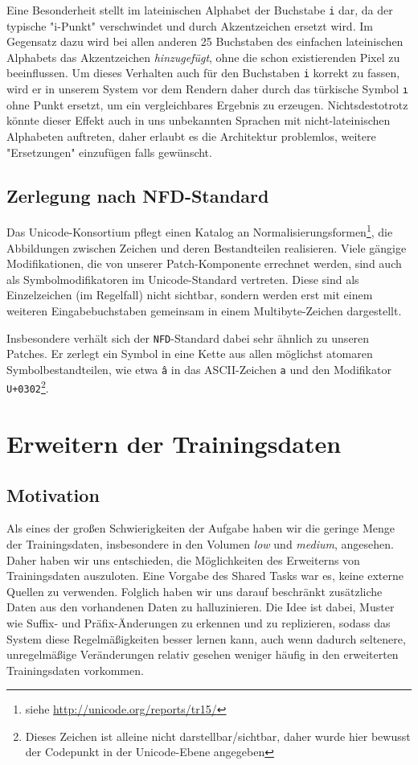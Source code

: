 \documentclass[a4paper]{article}
\begin{document}
Eine Besonderheit stellt im lateinischen Alphabet der Buchstabe \texttt{i} dar, da der typische "i-Punkt" verschwindet und durch Akzentzeichen ersetzt wird. Im Gegensatz dazu wird bei allen anderen 25 Buchstaben des einfachen lateinischen Alphabets das Akzentzeichen \textit{hinzugefügt}, ohne die schon existierenden Pixel zu beeinflussen. Um dieses Verhalten auch für den Buchstaben \texttt{i} korrekt zu fassen, wird er in unserem System vor dem Rendern daher durch das türkische Symbol \texttt{ı} ohne Punkt ersetzt, um ein vergleichbares Ergebnis zu erzeugen. Nichtsdestotrotz könnte dieser Effekt auch in uns unbekannten Sprachen mit nicht-lateinischen Alphabeten auftreten, daher erlaubt es die Architektur problemlos, weitere "Ersetzungen" einzufügen falls gewünscht.

\subsection{Zerlegung nach NFD-Standard}
Das Unicode-Konsortium pflegt einen Katalog an Normalisierungsformen\footnote{siehe \url{http://unicode.org/reports/tr15/}}, die Abbildungen zwischen Zeichen und deren Bestandteilen realisieren. Viele gängige Modifikationen, die von unserer Patch-Komponente errechnet werden, sind auch als Symbolmodifikatoren im Unicode-Standard vertreten. Diese sind als Einzelzeichen (im Regelfall) nicht sichtbar, sondern werden erst mit einem weiteren Eingabebuchstaben gemeinsam in einem Multibyte-Zeichen dargestellt.

Insbesondere verhält sich der \texttt{NFD}-Standard dabei sehr ähnlich zu unseren Patches. Er zerlegt ein Symbol in eine Kette aus allen möglichst atomaren Symbolbestandteilen, wie etwa \texttt{â} in das ASCII-Zeichen \texttt{a} und den Modifikator \texttt{U+0302}\footnote{Dieses Zeichen ist alleine nicht darstellbar/sichtbar, daher wurde hier bewusst der Codepunkt in der Unicode-Ebene angegeben}.

\section{Erweitern der Trainingsdaten}
\label{sec:enhancer}
\subsection{Motivation}
Als eines der großen Schwierigkeiten der Aufgabe haben wir die geringe Menge der Trainingsdaten, insbesondere in den Volumen \textit{low} und \textit{medium}, angesehen. Daher haben wir uns entschieden, die Möglichkeiten des Erweiterns von Trainingsdaten auszuloten. Eine Vorgabe des Shared Tasks war es, keine externe Quellen zu verwenden. Folglich haben wir uns darauf beschränkt zusätzliche Daten aus den vorhandenen Daten zu halluzinieren. Die Idee ist dabei, Muster wie Suffix- und Präfix-Änderungen zu erkennen und zu replizieren, sodass das System diese Regelmäßigkeiten besser lernen kann, auch wenn dadurch seltenere, unregelmäßige Veränderungen relativ gesehen weniger häufig in den erweiterten Trainingsdaten vorkommen.
\end{document}
